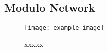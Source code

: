 \subsection{Modulo Network}

\lipsum[1]

\begin{figure}[H]
	\centering
	\texttt{[image: example-image]}
	\centering\caption{xxxxx}
	\label{fig:XXXX}
\end{figure}

\lipsum[1]







